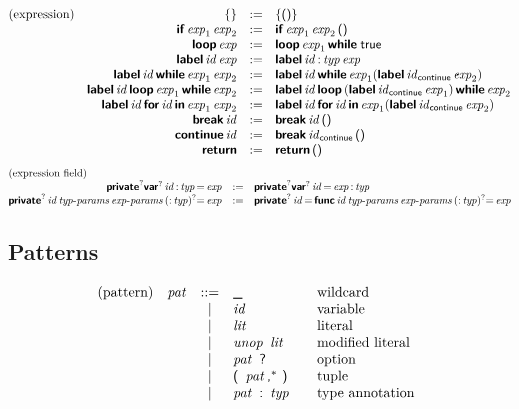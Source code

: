 $$
\begin{array}{@{}lrcl@{}}
\text{(expression)} &
\K\{ \K\} &:=&
  \K\{ \K{()} \K\} \\&
\KK{if} \x{exp}_1 \x{exp}_2 &:=&
  \KK{if} \x{exp}_1 \x{exp}_2 \K{()} \\&
\KK{loop} \x{exp} &:=&
  \KK{loop} \x{exp}_1 \KK{while} \; \K{true} \\&
\KK{label} \x{id} \x{exp} &:=&
  \KK{label} \x{id} \K: \x{typ} \x{exp} \\&
\KK{label} \x{id} \KK{while} \x{exp}_1 \x{exp}_2 &:=&
  \KK{label} \x{id} \KK{while} \x{exp}_1 (\KK{label} \x{id}_{\K{continue}} \x{exp}_2) \\&
\KK{label} \x{id} \KK{loop} \x{exp}_1 \KK{while} \x{exp}_2 &:=&
  \KK{label} \x{id} \KK{loop} \, (\KK{label} \x{id}_{\K{continue}} \x{exp}_1) \, \KK{while} \x{exp}_2 \\&
\KK{label} \x{id} \KK{for} \x{id} \KK{in} \x{exp}_1 \x{exp}_2 &:=&
  \KK{label} \x{id} \KK{for} \x{id} \KK{in} \x{exp}_1 (\KK{label} \x{id}_{\K{continue}} \x{exp}_2) \\&
\KK{break} \x{id} &:=&
  \KK{break} \x{id} \K{()} \\&
\KK{continue} \x{id} &:=&
  \KK{break} \x{id}_{\K{continue}} \K{()} \\&
\KK{return} &:=&
  \KK{return} \, \K{()} \\
\end{array}
$$
$$
\begin{array}{@{}rcl@{}}
\text{(expression field)} \hfill \\
\KK{private}^? \KK{var}^? \x{id} \K: \x{typ} \K= \x{exp} &:=&
  \KK{private}^? \KK{var}^? \x{id} \K= \x{exp} \K: \x{typ} \\
\KK{private}^? \x{id} \x{typ-params} \x{exp-params} \, (\K: \x{typ})^? \K= \x{exp} &:=&
  \KK{private}^? \x{id} \K= \, \KK{func} \x{id} \x{typ-params} \x{exp-params} \, (\K: \x{typ})^? \K= \x{exp} \\
\end{array}
$$


\subsection*{Patterns}

$$
\begin{array}{@{}lrcl@{\qquad}l}
\text{(pattern)} & \x{pat} &::=&
  \K\textunderscore
    & \text{wildcard} \\&&|&
  \x{id}
    & \text{variable} \\&&|&
  \x{lit}
    & \text{literal} \\&&|&
  \x{unop}~\x{lit}
    & \text{modified literal} \\&&|&
  \x{pat}~\K?
    & \text{option} \\&&|&
  \K(~\x{pat}\K,^\ast~\K)
    & \text{tuple} \\&&|&
  \x{pat}~\K:~\x{typ}
    & \text{type annotation} \\
\end{array}
$$


